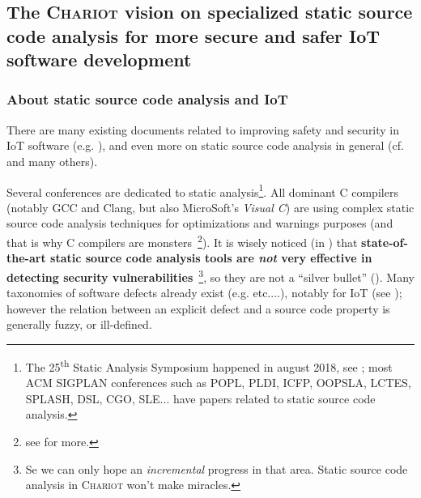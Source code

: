 \bigskip



\subsection{The \textsc{Chariot} vision on specialized static source code analysis for more secure and safer IoT software development}
\label{subsec:chariotvision}

\subsubsection{About static source code analysis and IoT}

  There are many
existing documents related to improving safety and security in IoT
software (e.g. \cite{Chen:2011:DAS, Medwed:2016:ISC,
  KUMAR:2019:cloud-security, Chakkaravarthy:2019:malware-analysis}),
and even more on static source code analysis in general
(cf. \cite{Gomes2009AnOO, GosevaPopstojanova2015OnTC,
  Binkley:2007:SCA} and many others). %

Several conferences are dedicated to static analysis\footnote{The
  25\textsuperscript{th} Static Analysis Symposium happened in
  august 2018, see
  ; most ACM
  SIGPLAN conferences such as POPL, PLDI, ICFP, OOPSLA, LCTES, SPLASH,
  DSL, CGO, SLE... have papers related to static source code
  analysis.}.  All dominant C compilers (notably GCC and Clang, but
also MicroSoft's \emph{Visual C}\texttrademark) are using complex
static source code analysis techniques for optimizations and warnings
purposes (and that is why C compilers are monsters~\footnote{see
  for more.}). It is wisely noticed (in
\cite{GosevaPopstojanova2015OnTC}) that \textbf{state-of-the-art
  static source code analysis tools are \emph{not} very effective in
  detecting  security
  vulnerabilities}~\footnote{Se we can only hope an \emph{incremental}
  progress in that area. Static source code analysis in
  \textsc{Chariot} won't make miracles.}, so they are not a ``silver
bullet''  (\cite{Brooks:1987:NSB}). Many
taxonomies of software defects  already exist
(e.g. \cite{Silva:2016:SES, Wagner:2008:DCD, Levine:2009:DDE}
etc....), notably for IoT (see \cite{Carpent:2018:RRA,
  Ahmad:2018:ModelBasedIoT, Laszlo:2017:Vessedia}); however the
relation between an explicit defect and a source code property is
generally fuzzy, or ill-defined.

